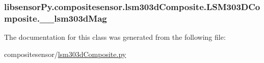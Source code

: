 \subsubsection[{\+\_\+\+\_\+lsm303d\+Mag}]{\setlength{\rightskip}{0pt plus 5cm}libsensor\+Py.\+compositesensor.\+lsm303d\+Composite.\+L\+S\+M303\+D\+Composite.\+\_\+\+\_\+lsm303d\+Mag\hspace{0.3cm}{\ttfamily [private]}}\label{classlibsensorPy_1_1compositesensor_1_1lsm303dComposite_1_1LSM303DComposite_ad74c0f9620317b6846ca31cf6a339dbf}


The documentation for this class was generated from the following file\+:\begin{DoxyCompactItemize}
\item 
compositesensor/\hyperlink{compositesensor_2lsm303dComposite_8py}{lsm303d\+Composite.\+py}\end{DoxyCompactItemize}
